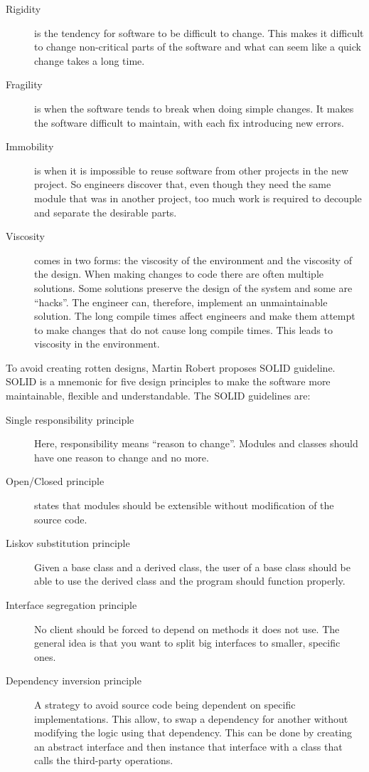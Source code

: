 \begin{description}

\item[ Rigidity ] is the tendency for software to be difficult to
change. This makes it difficult to change non-critical parts of the software and
what can seem like a quick change takes a long time.

\item[ Fragility ] is when the software tends to break when doing
simple changes. It makes the software difficult to maintain, with each fix
introducing new errors.

\item[ Immobility ] is when it is impossible to reuse software from
other projects in the new project. So engineers discover that, even though they
need the same module that was in another project, too much work is required to
decouple and separate the desirable parts.

\item[ Viscosity ] comes in two forms: the viscosity of the environment and the
    viscosity of the design. When making changes to code there are often
    multiple solutions. Some solutions preserve the design of the system and
    some are ``hacks''. The engineer can, therefore, implement an unmaintainable
    solution. The long compile times affect engineers and make them attempt to
    make changes that do not cause long compile times.  This leads to viscosity
    in the environment.

\end{description}

To avoid creating rotten designs, Martin Robert proposes SOLID guideline.  SOLID
is a mnemonic for five design principles to make the software more maintainable,
flexible and understandable. The SOLID guidelines are:

\begin{description}
    \item [Single responsibility principle] Here, responsibility means ``reason
        to change''. Modules and classes should have one reason to change and no
        more.
    \item [Open/Closed principle] states that modules should be
        extensible without modification of the source code.
    \item [Liskov substitution principle] Given a base class and a derived
        class, the user of a base class should be able to use the derived
        class and the program should function properly.
    \item [Interface segregation principle] No client should be forced to depend
        on methods it does not use. The general idea is that you want to split
        big interfaces to smaller, specific ones.
	\item [Dependency inversion principle] A strategy to avoid source code
being dependent on specific implementations.  This allow, to swap a dependency
for another without modifying the logic using that dependency. This can be done
by creating an abstract interface and then instance that interface with a class
that calls the third-party operations.
\end{description}

